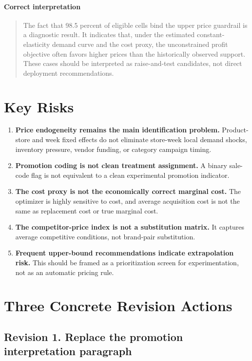 \documentclass[11pt]{article}
\begin{document}
\paragraph{Correct interpretation}
\begin{quote}
The fact that 98.5 percent of eligible cells bind the upper price guardrail is a diagnostic result. It indicates that, under the estimated constant-elasticity demand curve and the cost proxy, the unconstrained profit objective often favors higher prices than the historically observed support. These cases should be interpreted as raise-and-test candidates, not direct deployment recommendations.
\end{quote}

\section*{Key Risks}

\begin{enumerate}[leftmargin=1.5em]
    \item \textbf{Price endogeneity remains the main identification problem.} Product-store and week fixed effects do not eliminate store-week local demand shocks, inventory pressure, vendor funding, or category campaign timing.
    \item \textbf{Promotion coding is not clean treatment assignment.} A binary sale-code flag is not equivalent to a clean experimental promotion indicator.
    \item \textbf{The cost proxy is not the economically correct marginal cost.} The optimizer is highly sensitive to cost, and average acquisition cost is not the same as replacement cost or true marginal cost.
    \item \textbf{The competitor-price index is not a substitution matrix.} It captures average competitive conditions, not brand-pair substitution.
    \item \textbf{Frequent upper-bound recommendations indicate extrapolation risk.} This should be framed as a prioritization screen for experimentation, not as an automatic pricing rule.
\end{enumerate}

\section*{Three Concrete Revision Actions}

\subsection*{Revision 1. Replace the promotion interpretation paragraph}
\end{document}
